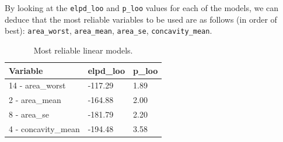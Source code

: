 \documentclass[
]{article}
\begin{document}
By looking at the \texttt{elpd\_loo} and \texttt{p\_loo} values for each
of the models, we can deduce that the most reliable variables to be used
are as follows (in order of best): \texttt{area\_worst},
\texttt{area\_mean}, \texttt{area\_se}, \texttt{concavity\_mean}.

\begin{table}[H]
\centering
\begin{tabular}{|l|l|l|}
\hline
\textbf{Variable}   & \textbf{elpd\_loo} & \textbf{p\_loo} \\ \hline
14 - area\_worst    & -117.29            & 1.89            \\ \hline
2 - area\_mean      & -164.88            & 2.00            \\ \hline
8 - area\_se        & -181.79            & 2.20            \\ \hline
4 - concavity\_mean & -194.48            & 3.58            \\ \hline
\end{tabular}
\caption{Most reliable linear models.}
\end{table}
\end{document}
